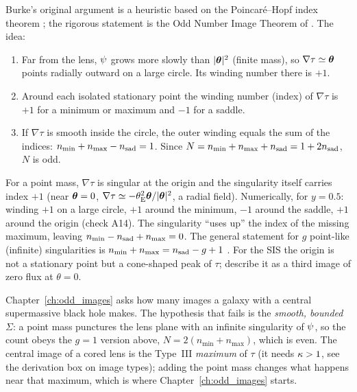 \begin{derivation}
Burke's original argument is a heuristic based on the Poincar\'e--Hopf index
theorem \citep{burke_1981}; the rigorous statement is the Odd Number Image
Theorem of \citet[Theorem~11.5]{petters_singularity_2001}.  The idea:
\begin{enumerate}[nosep]
  \item Far from the lens, $\psi$ grows more slowly than $|\boldsymbol{\theta}|^2$
        (finite mass), so $\nabla\tau\simeq\boldsymbol{\theta}$ points radially outward on
        a large circle.  Its winding number there is $+1$.
  \item Around each isolated stationary point the winding number (index) of
        $\nabla\tau$ is $+1$ for a minimum or maximum and $-1$ for a saddle.
  \item If $\nabla\tau$ is smooth inside the circle, the outer winding equals the
        sum of the indices: $n_{\min}+n_{\max}-n_{\rm sad} = 1$.  Since
        $N = n_{\min}+n_{\max}+n_{\rm sad} = 1 + 2n_{\rm sad}$, $N$ is odd.
\end{enumerate}
For a point mass, $\nabla\tau$ is singular at the origin and the singularity
itself carries index $+1$ (near $\boldsymbol{\theta}=0$, $\nabla\tau\simeq-\theta_{\mathrm{E}}^2\boldsymbol{\theta}/|\boldsymbol{\theta}|^2$,
a radial field).  Numerically, for $y=0.5$: winding $+1$ on a large circle, $+1$
around the minimum, $-1$ around the saddle, $+1$ around the origin (check A14).
The singularity ``uses up'' the index of the missing maximum, leaving
$n_{\min}-n_{\rm sad}+n_{\max} = 0$.  The general statement for $g$
point-like (infinite) singularities is
$n_{\min}+n_{\max} = n_{\rm sad}-g+1$ \citep[Theorem~11.4]{petters_singularity_2001}.
For the SIS the origin is not a stationary point but a cone-shaped peak of
$\tau$; \citet[Sect.~3.1]{narayan_lectures_1997} describe it as a third image
of zero flux at $\theta=0$.
\end{derivation}

\begin{bridge}
Chapter~\ref{ch:odd_images} asks how many images a galaxy with a central
supermassive black hole makes.  The hypothesis that fails is the
\emph{smooth, bounded} $\Sigma$: a point mass punctures the lens plane with an
infinite singularity of $\psi$, so the count obeys the $g=1$ version above,
$N = 2(n_{\min}+n_{\max})$, which is even.  The central image of a cored lens
is the Type~III \emph{maximum} of $\tau$ (it needs $\kappa>1$, see the
derivation box on image types); adding the point mass changes what happens
near that maximum, which is where Chapter~\ref{ch:odd_images} starts.
\end{bridge}


